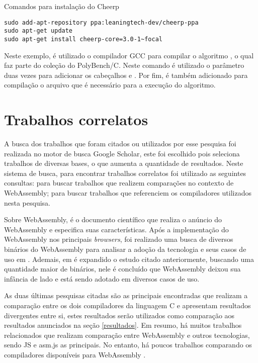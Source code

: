 \begin{quadro}
\caption{Comandos para instalação do Cheerp}
\begin{lstlisting}
sudo add-apt-repository ppa:leaningtech-dev/cheerp-ppa
sudo apt-get update
sudo apt-get install cheerp-core=3.0-1~focal
\end{lstlisting}
\label{instalacao_cheerp}
\end{quadro}

Neste exemplo, é utilizado o compilador GCC para compilar o algoritmo , o qual faz parte do coleção do PolyBench/C. Neste comando é utilizado o parâmetro  duas vezes para adicionar os cabeçalhos  e . Por fim, é também adicionado para compilação o arquivo  que é necessário para a execução do algoritmo.

\section{Trabalhos correlatos}\label{correlatos}

A busca dos trabalhos que foram citados ou utilizados por esse pesquisa foi realizada no motor de busca Google Scholar, este foi escolhido pois seleciona trabalhos de diversas bases, o que aumenta a quantidade de resultados. Neste sistema de busca, para encontrar trabalhos correlatos foi utilizado as seguintes consultas:  para buscar trabalhos que realizem comparações no contexto de WebAssembly;  para buscar trabalhos que referenciem os compiladores utilizados nesta pesquisa.

Sobre WebAssembly,  é o documento científico que realiza o anúncio do WebAssembly e especifica suas características. Após a implementação do WebAssembly nos principais \textit{browsers}, foi realizado uma busca de diversos binários do WebAssembly para analisar a adoção da tecnologia e seus casos de uso em . Ademais, em  é expandido o estudo citado anteriormente, buscando uma quantidade maior de binários, nele é concluído que WebAssembly deixou sua infância de lado e está sendo adotado em diversos casos de uso.

As duas últimas pesquisas citadas são as principais encontradas que realizam a comparação entre os dois compiladores da linguagem C e apresentam resultados divergentes entre si, estes resultados serão utilizados como comparação aos resultados anunciados na seção \ref{resultados}. Em resumo, há muitos trabalhos relacionados que realizam comparação entre WebAssembly e outros tecnologias, sendo JS e asm.js as principais. No entanto, há poucos trabalhos comparando os compiladores disponíveis para WebAssembly \cite{c_vs_rust}.

